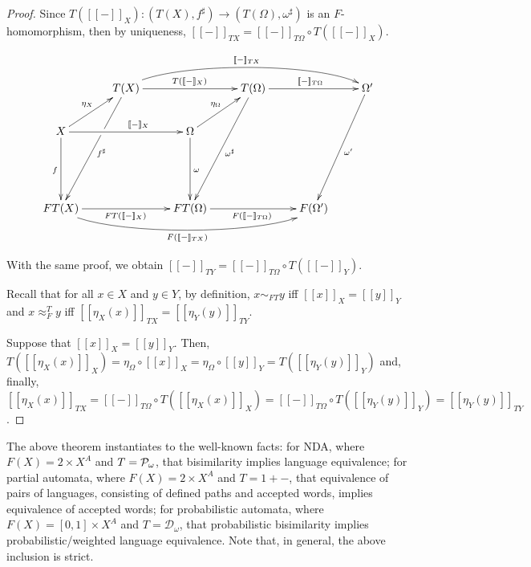 \documentclass{LMCS}
\def\pow#1{{\mathcal P_\omega}#1}
\newcommand{\bb}[1]{[\![ #1 ]\!]}
\begin{document}
\begin{proof}
Since $T(\bb{-}_X) \colon (T(X),f^{\sharp}) \to (T(\Omega), \omega^{\sharp})$ is an $F$-homomorphism, then by uniqueness,
$\bb{-}_{TX} =\bb{-}_{T\Omega} \circ T(\bb{-}_X)$.


\begin{center}
$$\xymatrix{ & T(X)\ar@(ur,ul)[rrrr]^{\bb{-}_{TX}} \ar@{}[dddl]^{f^{\sharp}} \ar[dddl]|(0.36){\hole} \ar[rr]^{T(\bb{-}_X)}& & T(\Omega) \ar[dddl]^{\omega^{\sharp}} \ar[rr]^{\bb{-}_{T\Omega}}& & \Omega' \ar[dddl]^{\omega'} \\
X \ar[rr]^(0.6){\bb{-}_X} \ar[dd]_f \ar[ur]^{\eta_X} & & \Omega \ar[dd]^{\omega} \ar[ur]^{\eta_{\Omega}} \\
\\
FT(X) \ar[rr]_{FT(\bb{-}_X)} \ar@(dr,dl)[rrrr]_{F(\bb{-}_{TX})} & & FT(\Omega) \ar[rr]_{F(\bb{-}_{T\Omega})} & & F(\Omega') }$$
\end{center}


With the same proof, we obtain $\bb{-}_{TY} =\bb{-}_{T\Omega} \circ T(\bb{-}_Y)$. 

Recall that for all $x\in X$ and $y\in Y$, by definition,
$x\sim_{FT} y$ iff $\bb{x}_X = \bb{y}_Y$ and $x\approx_F^T y$ iff $\bb{\eta_X(x)}_{TX} = \bb{\eta_Y(y)}_{TY}$.

Suppose that $\bb{x}_X = \bb{y}_Y$. Then, $ T(\bb{\eta_X (x)}_X) = \eta_{\Omega} \circ \bb{x}_X = \eta_{\Omega} \circ \bb{y}_Y = T(\bb{\eta_Y (y)}_Y)$ and, finally,
$\bb{\eta_X(x)}_{TX} = \bb{-}_{T\Omega} \circ T(\bb{\eta_X(x)}_X) = \bb{-}_{T\Omega} \circ T(\bb{\eta_Y(y)}_Y) = \bb{\eta_Y(y)}_{TY}$.
\end{proof}


The above theorem  instantiates to the well-known facts: for NDA, where $F(X) = 2 \times
X^A$ and $T=\pow$,  that bisimilarity implies language
equivalence; for partial automata,  where $F(X) = 2 \times
X^A$ and $T=1+-$, that equivalence of pairs of languages, consisting
of defined paths and accepted words, implies
equivalence of accepted words; for probabilistic automata, where $F(X)
= [0,1] \times X^A$ and $T=\mathcal D_\omega$, that probabilistic
bisimilarity implies probabilistic/weighted language equivalence. Note that, in general, the
above inclusion is strict.
\end{document}
